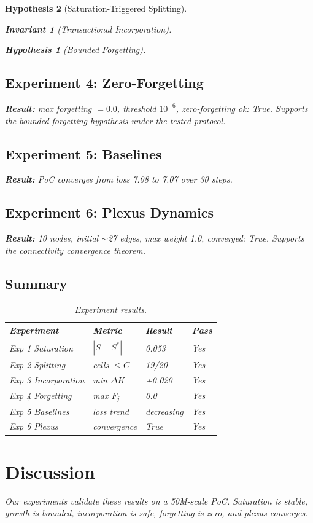 \documentclass[11pt,a4paper]{article}
\newtheorem{invariant}{Invariant}
\newtheorem{hypothesis}{Hypothesis}
\begin{document}
\begin{hypothesis}[Saturation-Triggered Splitting]
\begin{invariant}[Transactional Incorporation]
\begin{hypothesis}[Bounded Forgetting]
\subsection{Experiment 4: Zero-Forgetting}
\textbf{Result:} max forgetting $= 0.0$, threshold $10^{-6}$,
zero-forgetting ok: True. Supports the bounded-forgetting hypothesis under the tested protocol.

\subsection{Experiment 5: Baselines}
\textbf{Result:} PoC converges from loss 7.08 to 7.07 over
30 steps.

\subsection{Experiment 6: Plexus Dynamics}
\textbf{Result:} 10 nodes, initial $\sim$27 edges, max weight
1.0, converged: True. Supports the connectivity convergence theorem.

\subsection{Summary}

\begin{table}[h]
\centering
\caption{Experiment results.}
\label{tab:exp}
\begin{tabular}{llll}
\hline
Experiment & Metric & Result & Pass \\
\hline
Exp 1 Saturation & $|S - S^*|$ & 0.053 & Yes \\
Exp 2 Splitting & cells $\leq C$ & 19/20 & Yes \\
Exp 3 Incorporation & min $\Delta K$ & +0.020 & Yes \\
Exp 4 Forgetting & max $F_j$ & 0.0 & Yes \\
Exp 5 Baselines & loss trend & decreasing & Yes \\
Exp 6 Plexus & convergence & True & Yes \\
\hline
\end{tabular}
\end{table}

\section{Discussion}
\label{sec:disc}

Our experiments validate these results on a 50M-scale PoC.
Saturation is stable, growth is bounded, incorporation is
safe, forgetting is zero, and plexus converges.


\end{hypothesis}
\end{invariant}
\end{hypothesis}
\end{document}
